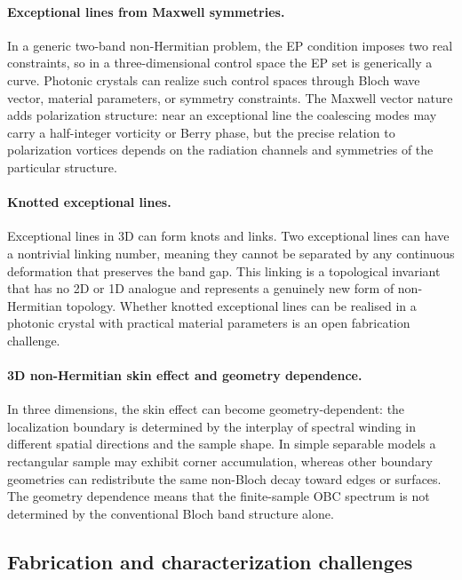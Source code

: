 \paragraph{Exceptional lines from Maxwell symmetries.}
In a generic two-band non-Hermitian problem, the EP condition imposes
two real constraints, so in a three-dimensional control space the EP set
is generically a curve. Photonic crystals can realize such control
spaces through Bloch wave vector, material parameters, or symmetry
constraints. The Maxwell vector nature adds polarization structure:
near an exceptional line the coalescing modes may carry a half-integer
vorticity or Berry phase, but the precise relation to polarization
vortices depends on the radiation channels and symmetries of the
particular structure.

\paragraph{Knotted exceptional lines.}
Exceptional lines in 3D can form knots and links. Two exceptional
lines can have a nontrivial linking number, meaning they cannot be
separated by any continuous deformation that preserves the band gap.
This linking is a topological invariant that has no 2D or 1D analogue
and represents a genuinely new form of non-Hermitian topology. Whether
knotted exceptional lines can be realised in a photonic crystal with
practical material parameters is an open fabrication challenge.

\paragraph{3D non-Hermitian skin effect and geometry dependence.}
In three dimensions, the skin effect can become geometry-dependent: the
localization boundary is determined by the interplay of spectral winding
in different spatial directions and the sample shape. In simple
separable models a rectangular sample may exhibit corner accumulation,
whereas other boundary geometries can redistribute the same non-Bloch
decay toward edges or surfaces. The geometry dependence means that the
finite-sample OBC spectrum is not determined by the conventional Bloch
band structure alone.

\subsection{Fabrication and characterization challenges}
\label{ssec:3d-challenges}

